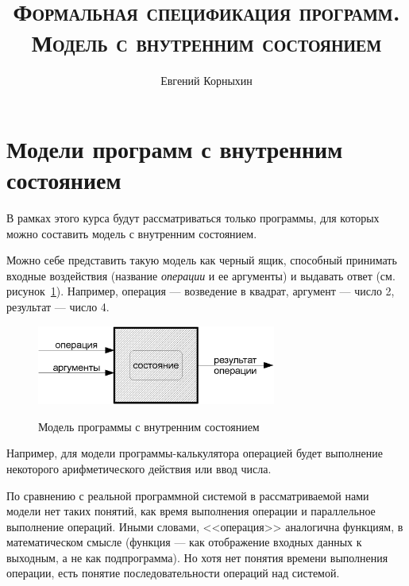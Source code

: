 \documentclass[14pt, twoside]{extreport}
\author{Евгений Корныхин}
\title{\huge{\textbf{\textsc{Формальная спецификация программ. Модель с внутренним состоянием}}}}
\begin{document}
\maketitle

\tableofcontents \pagebreak





\section*{Модели программ с внутренним состоянием}

В рамках этого курса будут рассматриваться только  программы, для которых можно составить модель с внутренним состоянием.

Можно себе представить такую модель как черный ящик, способный принимать входные воздействия (название \emph{операции} и ее аргументы) и выдавать ответ (см. рисунок~\ref{fig:machine}). Например, операция --- возведение в квадрат, аргумент --- число 2, результат --- число 4. 

\begin{figure}[h] \center
  \includegraphics[width=0.7\textwidth]{rsl/machine}\\
  \caption{Модель программы с внутренним состоянием}\label{fig:machine}
\end{figure}

Например, для модели программы-калькулятора операцией будет выполнение некоторого арифметического действия или ввод числа.

По сравнению с реальной программной системой в рассматриваемой нами модели нет таких понятий, как время выполнения операции и параллельное выполнение операций. Иными словами, <<операция>> аналогична функциям, в математическом смысле (функция --- как отображение входных данных к выходным, а не как подпрограмма). Но хотя нет понятия времени выполнения операции, есть понятие последовательности операций над системой.
\end{document}
